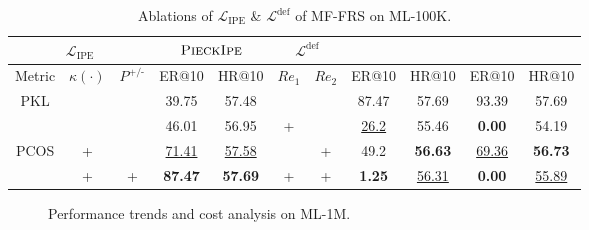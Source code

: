 \begin{table}[tb]
    \centering
    \caption{Ablations of $\mathcal{L}_\text{IPE}$ \& $\mathcal{L}^\text{def}$ of MF-FRS on ML-100K.}
    \renewcommand{\arraystretch}{0.7}
    \setlength{\tabcolsep}{0.32mm}
    \begin{tabular}{c|cc|cc||cc|cc|cc}
        \toprule
        \multicolumn{3}{c|}{$\mathcal{L}_\text{IPE}$} &\multicolumn{2}{c||}{$\textsc{PieckIpe}{}$} & \multicolumn{2}{c|}{$\mathcal{L}^\text{def}$}  & \multicolumn{2}{c|}{\modelI{}} & \multicolumn{2}{c}{\modelII{}} \\
        \midrule
        Metric  & $\kappa(\cdot)$ & ${P}^\text{+/-}$ & ER@10 &HR@10 & $\mathit{Re}_1$ & $\mathit{Re}_2$ & ER@10 &HR@10 & ER@10 &HR@10 \\
        \midrule
        \rowcolor[HTML]{F2F2F2} PKL & & &39.75 &57.48 & & &87.47 &57.69 &93.39 &57.69\\
        & & &46.01 &56.95  &+ & &\underline{26.2} &55.46 &\textbf{0.00} &54.19 \\
        PCOS&+ & &\underline{71.41} &\underline{57.58} & &+  &49.2 &\textbf{56.63} &\underline{69.36} &\textbf{56.73}\\
        &+ &+ &\textbf{87.47} &\textbf{57.69} &+ &+ 
    &\textbf{1.25} &\underline{56.31} &\textbf{0.00} &\underline{55.89} \\
        \bottomrule
    \end{tabular}
    \label{tab:abla-combined}
\end{table}

\begin{figure}[tbp]
\centering
    \caption{Performance trends and cost analysis on ML-1M.}
    \label{fig:trends_cost}
\end{figure}

